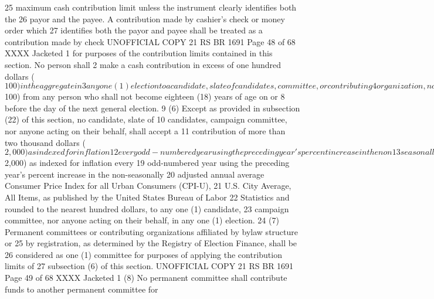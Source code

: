 25 maximum cash contribution limit unless the instrument clearly identifies both the
26 payor and the payee. A contribution made by cashier's check or money order which
27 identifies both the payor and payee shall be treated as a contribution made by check 
UNOFFICIAL COPY 21 RS BR 1691
Page 48 of 68
XXXX Jacketed
1 for purposes of the contribution limits contained in this section. No person shall
2 make a cash contribution in excess of one hundred dollars ($100) in the aggregate in
3 any one (1) election to a candidate, slate of candidates, committee, or contributing
4 organization, nor anyone on their behalf.
5 (5) No candidate, slate of candidates, committee, contributing organization, nor anyone
6 on their behalf, shall accept any contribution in excess of one hundred dollars
7 ($100) from any person who shall not become eighteen (18) years of age on or
8 before the day of the next general election.
9 (6) Except as provided in subsection (22) of this section, no candidate, slate of
10 candidates, campaign committee, nor anyone acting on their behalf, shall accept a
11 contribution of more than two thousand dollars ($2,000)as indexed for inflation
12 every odd-numbered year using the preceding year's percent increase in the non13 seasonally adjusted annual average Consumer Price Index for all Urban Consumers
14 (CPI-U), U.S. City Average, All Items, for that year as published by the United
15 States Bureau of Labor Statistics and rounded to the nearest hundred dollars, from
16 any person, permanent committee, or contributing organization in any one (1)
17 election. No person, permanent committee, or contributing organization shall
18 contribute more than two thousand dollars ($2,000) as indexed for inflation every
19 odd-numbered year using the preceding year's percent increase in the non-seasonally
20 adjusted annual average Consumer Price Index for all Urban Consumers (CPI-U),
21 U.S. City Average, All Items, as published by the United States Bureau of Labor
22 Statistics and rounded to the nearest hundred dollars, to any one (1) candidate,
23 campaign committee, nor anyone acting on their behalf, in any one (1) election.
24 (7) Permanent committees or contributing organizations affiliated by bylaw structure or
25 by registration, as determined by the Registry of Election Finance, shall be
26 considered as one (1) committee for purposes of applying the contribution limits of
27 subsection (6) of this section.
UNOFFICIAL COPY 21 RS BR 1691
Page 49 of 68
XXXX Jacketed
1 (8) No permanent committee shall contribute funds to another permanent committee for
